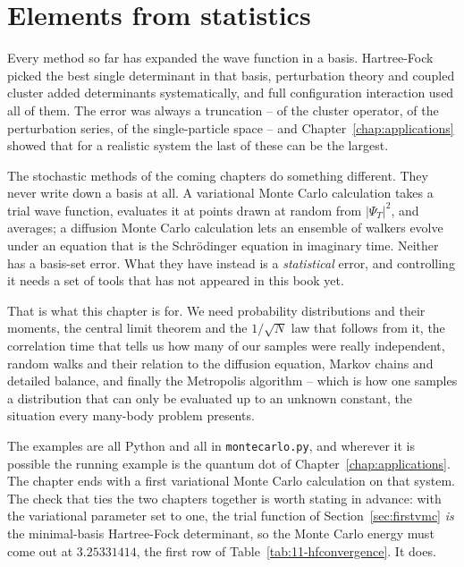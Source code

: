 \chapter{Elements from statistics}
\label{chap:statelements}

Every method so far has expanded the wave function in a basis.  Hartree-Fock
picked the best single determinant in that basis, perturbation theory and
coupled cluster added determinants systematically, and full configuration
interaction used all of them.  The error was always a truncation -- of the
cluster operator, of the perturbation series, of the single-particle space --
and Chapter~\ref{chap:applications} showed that for a realistic system the
last of these can be the largest.

The stochastic methods of the coming chapters do something different.  They
never write down a basis at all.  A variational Monte Carlo calculation takes
a trial wave function, evaluates it at points drawn at random from
$|\Psi_T|^2$, and averages; a diffusion Monte Carlo calculation lets an
ensemble of walkers evolve under an equation that is the Schr\"odinger
equation in imaginary time.  Neither has a basis-set error.  What they have
instead is a \emph{statistical} error, and controlling it needs a set of tools
that has not appeared in this book yet.

That is what this chapter is for.  We need probability distributions and their
moments, the central limit theorem and the $1/\sqrt{N}$ law that follows from
it, the correlation time that tells us how many of our samples were really
independent, random walks and their relation to the diffusion equation,
Markov chains and detailed balance, and finally the Metropolis algorithm --
which is how one samples a distribution that can only be evaluated up to an
unknown constant, the situation every many-body problem presents.

The examples are all Python and all in \texttt{montecarlo.py}, and wherever it
is possible the running example is the quantum dot of
Chapter~\ref{chap:applications}.  The chapter ends with a first variational
Monte Carlo calculation on that system.  The check that ties the two chapters
together is worth stating in advance: with the variational parameter set to
one, the trial function of Section~\ref{sec:firstvmc} \emph{is} the
minimal-basis Hartree-Fock determinant, so the Monte Carlo energy must come
out at $3.25331414$, the first row of Table~\ref{tab:11-hfconvergence}.  It
does.

